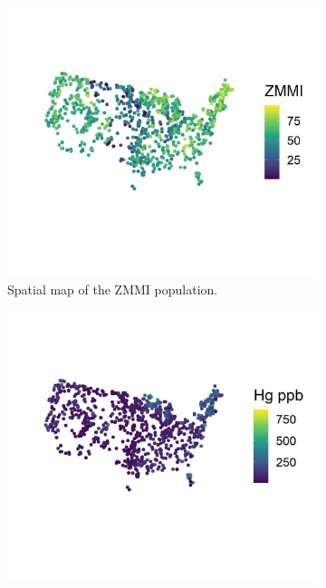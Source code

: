 \documentclass[]{elsarticle} %
\begin{document}
\begin{figure}
\centering
\begin{subfigure}{0.49\textwidth}
  \centering
  \includegraphics[width = 1\linewidth]{figures/zmmi_map.jpeg}
  \caption{Spatial map of the ZMMI population.}
  \label{fig:zmmi_map}
\end{subfigure}
\begin{subfigure}{0.49\textwidth}
  \centering
  \includegraphics[width = 1\linewidth]{figures/mercury_map.jpeg}

\end{subfigure}
\end{figure}
\end{document}
